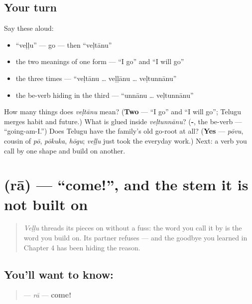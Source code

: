 \subsection*{Your turn}
Say these aloud:

\begin{itemize}
\raggedright
  \item \textquotedblleft{}veḷḷu\textquotedblright{} — go — then \textquotedblleft{}veḷtānu\textquotedblright{}
  \item the two meanings of one form — \textquotedblleft{}I go\textquotedblright{} and \textquotedblleft{}I will go\textquotedblright{}
  \item the three times — \textquotedblleft{}veḷtānu … veḷḷānu … veḷtunnānu\textquotedblright{}
  \item the be-verb hiding in the third — \textquotedblleft{}unnānu … veḷtunnānu\textquotedblright{}
\end{itemize}

\begin{tcolorbox}[breakable,colback=teal!4,colframe=teal!35!black,title={Before you move on}]
How many things does \emph{veḷtānu} mean? (\textbf{Two} — \textquotedblleft{}I go\textquotedblright{} and \textquotedblleft{}I will go\textquotedblright{}; Telugu merges habit and future.) What is glued inside \emph{veḷtunnānu}? (\textbf{-}, the be-verb — \textquotedblleft{}going-am-I.\textquotedblright{}) Does Telugu have the family's old go-root at all? (\textbf{Yes} — \emph{pōvu}, cousin of \emph{pō}, \emph{pōkuka}, \emph{hōgu}; \emph{veḷḷu} just took the everyday work.) Next: a verb you call by one shape and build on another.
\end{tcolorbox}
\section[\texorpdfstring{\te{రా} (rā)}{రా (rā)}]{ (rā) — \textquotedblleft{}come!\textquotedblright{}, and the stem it is not built on}

\label{lesson:TE-C32-raa}



\begin{quote}
\emph{Veḷḷu} threads its pieces on without a fuss: the word you call it by is the word you build on. Its partner refuses — and the goodbye you learned in Chapter 4 has been hiding the reason.
\end{quote}

\subsection*{You'll want to know: }
\begin{quote}
\textbf{} — \emph{rā} — \textbf{come!}
\end{quote}

